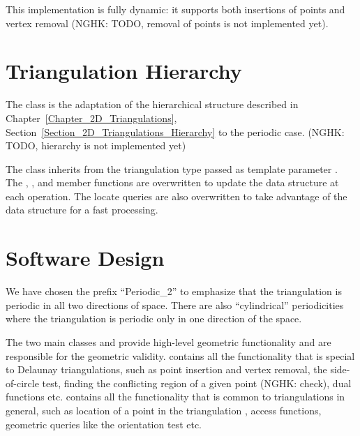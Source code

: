 This implementation is fully dynamic: it supports both insertions of
points and vertex removal (NGHK: TODO, removal of points is not
implemented yet).

\section{Triangulation Hierarchy}
The class  is the adaptation
of the hierarchical structure described in
Chapter~\ref{Chapter_2D_Triangulations},
Section~\ref{Section_2D_Triangulations_Hierarchy} to the periodic
case. (NGHK: TODO, hierarchy is not implemented yet)

The class  inherits from the
triangulation type passed as template parameter . 
The , , and  member functions
are  overwritten to update the data structure at each operation.
The locate queries are also overwritten to take advantage of the data
structure for a fast processing.

\section{Software Design\label{P2Triangulation2-sec-design}}
We have chosen the prefix ``Periodic\_2'' to emphasize that the
triangulation is periodic in all two directions of space. There are
also ``cylindrical'' periodicities where the triangulation is periodic
only in one direction of the space.

The two main classes  and
 provide high-level geometric
functionality and are responsible for the geometric validity.
 contains all the
functionality that is special to Delaunay triangulations, such as
point insertion and vertex removal, the side-of-circle test, finding
the conflicting region of a given point (NGHK: check), dual functions etc.
 contains all the functionality
that is common to triangulations in general, such as location of a
point in the triangulation \cite{cgal:dpt-wt-02}, access functions,
geometric queries like the orientation test etc.

